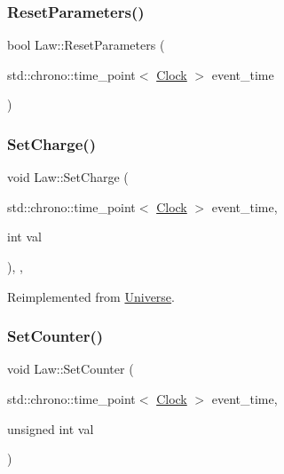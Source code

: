 \subsubsection{\texorpdfstring{Reset\+Parameters()}{ResetParameters()}}
{\footnotesize\ttfamily bool Law\+::\+Reset\+Parameters (\begin{DoxyParamCaption}\item[{std\+::chrono\+::time\+\_\+point$<$ \mbox{\hyperlink{universe_8h_a0ef8d951d1ca5ab3cfaf7ab4c7a6fd80}{Clock}} $>$}]{event\+\_\+time }\end{DoxyParamCaption})}

\mbox{\label{classLaw_a2e780573f6285f88d167d45a2e243d01}} 
\subsubsection{\texorpdfstring{Set\+Charge()}{SetCharge()}}
{\footnotesize\ttfamily void Law\+::\+Set\+Charge (\begin{DoxyParamCaption}\item[{std\+::chrono\+::time\+\_\+point$<$ \mbox{\hyperlink{universe_8h_a0ef8d951d1ca5ab3cfaf7ab4c7a6fd80}{Clock}} $>$}]{event\+\_\+time,  }\item[{int}]{val }\end{DoxyParamCaption})\hspace{0.3cm}{\ttfamily [inline]}, {\ttfamily [final]}, {\ttfamily [virtual]}}



Reimplemented from \mbox{\hyperlink{classUniverse_a3b3da7c86a7b75e5e5c0b7972ac82a87}{Universe}}.

\mbox{\label{classLaw_a408c401c8a44870c29ba9d08b45cb40f}} 
\subsubsection{\texorpdfstring{Set\+Counter()}{SetCounter()}}
{\footnotesize\ttfamily void Law\+::\+Set\+Counter (\begin{DoxyParamCaption}\item[{std\+::chrono\+::time\+\_\+point$<$ \mbox{\hyperlink{universe_8h_a0ef8d951d1ca5ab3cfaf7ab4c7a6fd80}{Clock}} $>$}]{event\+\_\+time,  }\item[{unsigned int}]{val }\end{DoxyParamCaption})\hspace{0.3cm}{\ttfamily [virtual]}}



